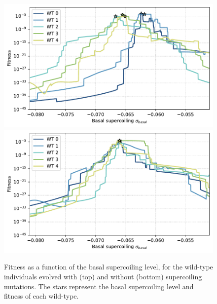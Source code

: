 \begin{figure}
\centering
\includegraphics[width=\textwidth]{epistasis/img/with-sc/fitness_landscapes_wt.pdf}
\includegraphics[width=\textwidth]{epistasis/img/control/fitness_landscapes_wt.pdf}
\caption[Supercoiling fitness landscapes for the wild-type individuals evolved with and without supercoiling mutations]{Fitness as a function of the basal supercoiling level, for the wild-type individuals evolved with (top) and without (bottom) supercoiling mutations.
The stars represent the basal supercoiling level and fitness of each wild-type.}
\label{fig:epistasis:fitness-landscapes-wt}
\end{figure}

